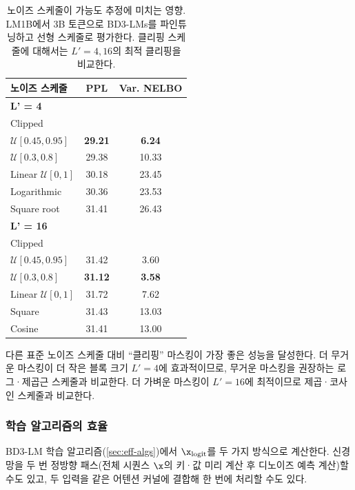 \documentclass{article} %
\def\algos{BD3-LMs}
\def\algo{BD3-LM}
\begin{document}
\begin{table}
  \vspace{-13pt}
  \small
  \caption{노이즈 스케줄이 가능도 추정에 미치는 영향. LM1B에서 3B 토큰으로 \algos{}를 파인튜닝하고 선형 스케줄로 평가한다. 클리핑 스케줄에 대해서는 \(L' = 4, 16\)의 최적 클리핑을 비교한다.}
  \vspace{-8pt}
  \label{tab:var_ns_training}
  \centering
  \begin{tabular}{lcc}
    \toprule
    노이즈 스케줄 & PPL & Var. NELBO \\
    \midrule
    \textbf{L' = 4} &&\\
    Clipped &&\\
    \quad \(\mathcal{U}[0.45, 0.95]\) & \textbf{29.21} & \textbf{6.24} \\
    \quad \(\mathcal{U}[0.3, 0.8]\) & 29.38 & 10.33 \\
    Linear \(\mathcal{U}[0,1]\) & 30.18 & 23.45 \\
    Logarithmic & 30.36 & 23.53 \\
    Square root & 31.41 & 26.43 \\
    \midrule
    \textbf{L' = 16} &&\\
    Clipped &&\\
    \quad \(\mathcal{U}[0.45, 0.95]\) & 31.42 & 3.60 \\
    \quad \(\mathcal{U}[0.3, 0.8]\) & \textbf{31.12} & \textbf{3.58} \\
    Linear \(\mathcal{U}[0,1]\) & 31.72 & 7.62 \\
    Square & 31.43 & 13.03 \\
    Cosine & 31.41 & 13.00 \\
    \bottomrule
  \end{tabular}
  \vspace{-40pt}
\end{table}

다른 표준 노이즈 스케줄 \citep{chang2022maskgit} 대비 ``클리핑'' 마스킹이 가장 좋은 성능을 달성한다. 더 무거운 마스킹이 더 작은 블록 크기 $L'=4$에 효과적이므로, 무거운 마스킹을 권장하는 로그·제곱근 스케줄과 비교한다. 더 가벼운 마스킹이 $L'=16$에 최적이므로 제곱·코사인 스케줄과 비교한다.



\subsubsection*{학습 알고리즘의 효율}
\algo{} 학습 알고리즘(\cref{sec:eff-algs})에서 $\x_{\text{logit}}$를 두 가지 방식으로 계산한다. 신경망을 두 번 정방향 패스(전체 시퀀스 $\x$의 키·값 미리 계산 후 디노이즈 예측 계산)할 수도 있고, 두 입력을 같은 어텐션 커널에 결합해 한 번에 처리할 수도 있다.
\end{document}
